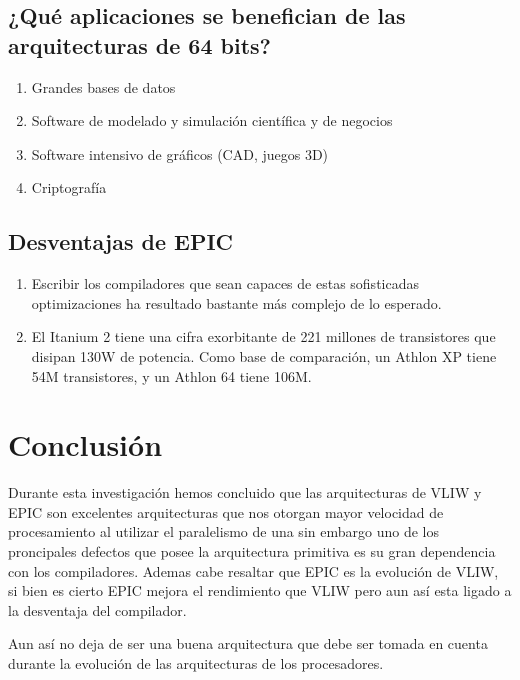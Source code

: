 \documentclass[11pt, conference]{IEEEtran}
\begin{document}
\subsection{¿Qué aplicaciones se benefician de las arquitecturas de 64 bits?}
\begin{enumerate}
	\item Grandes bases de datos
	\item Software de modelado y simulación científica y de negocios
	\item Software intensivo de gráficos (CAD, juegos 3D)
	\item Criptografía
\end{enumerate}

\subsection{Desventajas de EPIC}
\begin{enumerate}
	\item Escribir los compiladores que sean capaces de estas sofisticadas optimizaciones ha resultado bastante más complejo de lo esperado.
	\item El Itanium 2 tiene una cifra exorbitante de 221 millones de transistores que disipan 130W de potencia. Como base de comparación, un Athlon
	XP tiene 54M transistores, y un Athlon 64 tiene 106M.
\end{enumerate}
\section{Conclusión}
Durante esta investigación hemos concluido que las arquitecturas de VLIW y EPIC son excelentes arquitecturas que nos otorgan mayor velocidad de procesamiento al utilizar el paralelismo de una sin embargo uno de los proncipales defectos que posee la arquitectura primitiva es su gran dependencia con los compiladores. Ademas cabe resaltar que EPIC es la evolución de VLIW, si bien es cierto EPIC mejora el rendimiento que VLIW pero aun así esta ligado a la desventaja del compilador.

Aun así no deja de ser una buena arquitectura que debe ser tomada en cuenta durante la evolución de las arquitecturas de los procesadores.
\end{document}
